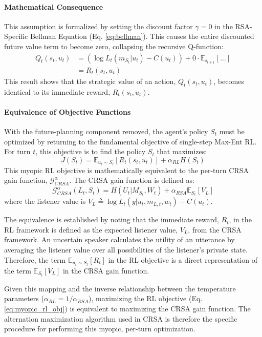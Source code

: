 \documentclass[12pt, a4paper]{report}
\begin{document}
\paragraph{Mathematical Consequence}
This assumption is formalized by setting the discount factor $\gamma=0$ in the RSA-Specific Bellman Equation (Eq. \ref{eq:bellman}). This causes the entire discounted future value term to become zero, collapsing the recursive Q-function:
\begin{align}
Q_{t}(s_{t},u_{t}) &= (\log L_{t}(m_{S_{t}}|u_{t}) - C(u_{t})) + 0 \cdot \mathbb{E}_{s_{t+1}}\left[\dots\right] \\
&= R_t(s_t, u_t)
\end{align}
This result shows that the strategic value of an action, $Q_t(s_t, u_t)$, becomes identical to its immediate reward, $R_t(s_t, u_t)$.

\paragraph{Equivalence of Objective Functions}
With the future-planning component removed, the agent's policy $S_t$ must be optimized by returning to the fundamental objective of single-step Max-Ent RL. For turn $t$, this objective is to find the policy $S_t$ that maximizes:
\begin{equation}
J(S_t) = \mathbb{E}_{u_{t}\sim S_{t}}[R_{t}(s_{t},u_{t})]+\alpha_{RL}H(S_{t}) \label{eq:myopic_rl_obj}
\end{equation}
This myopic RL objective is mathematically equivalent to the per-turn CRSA gain function, $\mathcal{G}_{CRSA}^{\alpha}$. The CRSA gain function is defined as:
\begin{equation}
\mathcal{G}_{CRSA}^{\alpha}(L_{t},S_{t})=H(U_{t}|M_{S_{t}},W_{t})+\alpha_{RSA}\mathbb{E}_{S_{t}}[V_{L}]
\end{equation}
where the listener value is $V_{L} \triangleq \log L_{t}(y|u_{t},m_{L,t},w_{t})-C(u_{t})$.

The equivalence is established by noting that the immediate reward, $R_t$, in the RL framework is defined as the expected listener value, $V_L$, from the CRSA framework. An uncertain speaker calculates the utility of an utterance by averaging the listener value over all possibilities of the listener's private state. Therefore, the term $\mathbb{E}_{u_{t}\sim S_{t}}[R_{t}]$ in the RL objective is a direct representation of the term $\mathbb{E}_{S_{t}}[V_{L}]$ in the CRSA gain function.

Given this mapping and the inverse relationship between the temperature parameters ($\alpha_{RL}=1/\alpha_{RSA}$), maximizing the RL objective (Eq. \ref{eq:myopic_rl_obj}) is equivalent to maximizing the CRSA gain function. The alternation maximization algorithm used in CRSA is therefore the specific procedure for performing this myopic, per-turn optimization.
\end{document}
